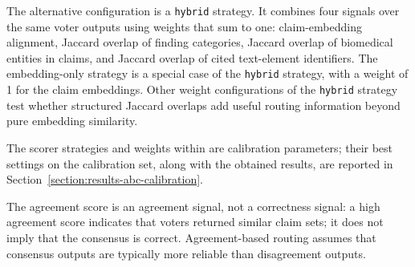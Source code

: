 The alternative configuration is a \texttt{hybrid} strategy. It combines four signals over the same voter outputs using weights that sum to one: claim-embedding alignment, Jaccard overlap of finding categories, Jaccard overlap of biomedical entities in claims, and Jaccard overlap of cited text-element identifiers. The embedding-only strategy is a special case of the \texttt{hybrid} strategy, with a weight of 1 for the claim embeddings. Other weight configurations of the \texttt{hybrid} strategy test whether structured Jaccard overlaps add useful routing information beyond pure embedding similarity.

The scorer strategies and weights within are calibration parameters; their best settings on the calibration set, along with the obtained results, are reported in Section~\ref{section:results-abc-calibration}.

The agreement score is an agreement signal, not a correctness signal: a high agreement score indicates that voters returned similar claim sets; it does not imply that the consensus is correct. Agreement-based routing assumes that consensus outputs are typically more reliable than disagreement outputs.